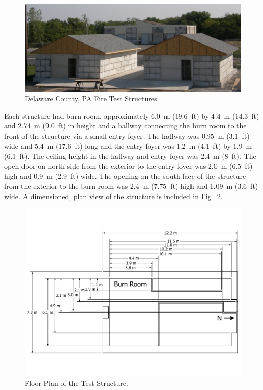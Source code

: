 \documentclass[12pt,oneside]{book}
\begin{document}
\begin{figure}[!ht]
	\includegraphics[width=6in]{../Figures/Pictures/DelCo_Structures}
	\caption{Delaware County, PA Fire Test Structures}
	\label{fig:Delaware_County,_PA_Fire_Test_Structures}
\end{figure}

Each structure had burn room, approximately 6.0~m (19.6~ft) by 4.4~m (14.3~ft) and 2.74~m (9.0~ft) in height and a hallway connecting the burn room to the front of the structure via a small entry foyer. The hallway was 0.95~m (3.1~ft) wide and 5.4~m (17.6~ft) long and the entry foyer was 1.2~m (4.1~ft) by 1.9~m (6.1~ft). The ceiling height in the hallway and entry foyer was 2.4~m (8~ft).  The open door on north side from the exterior to the entry foyer was 2.0~m (6.5~ft) high and 0.9~m (2.9~ft) wide. The opening on the south face of the structure from the exterior to the burn room was 2.4~m (7.75~ft) high and 1.09~m (3.6~ft) wide. A dimensioned, plan view of the structure is included in Fig.~\ref{fig:Test_Structure_Floor_Plan}.

\begin{figure}[!ht]
	\includegraphics[width=\columnwidth]{../Figures/Floor_Plans/PDFs/East_Structure/DelCo_2012_East_Structure_Plain}
	\caption{Floor Plan of the Test Structure.}
	\label{fig:Test_Structure_Floor_Plan}
\end{figure}
\end{document}
